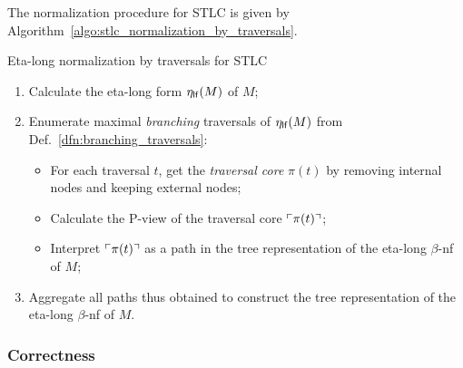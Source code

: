 \documentclass{article}
\theoremstyle{definition}
\def\coresymbol{\pi} %
\newcommand{\core}[1]{\coresymbol(#1)} %
\begin{document}
The normalization procedure for STLC is given by Algorithm~\ref{algo:stlc_normalization_by_traversals}.

\begin{algorithm}[!ht]
\caption{Eta-long normalization by traversals for STLC}
\label{algo:stlc_normalization_by_traversals}
\begin{algorithmic}
\begin{enumerate}
  \item Calculate the eta-long form $\eta_{\sf lf}(M)$ of $M$;
  \item Enumerate maximal \emph{branching} traversals of $\eta_{\sf lf}(M)$ from Def.~\ref{dfn:branching_traversals}:
  \begin{itemize}
  \item For each traversal $t$, get the \emph{traversal core} $\core{t}$ by removing internal nodes and keeping external nodes;
  \item Calculate the P-view of the traversal core $\pview{\core{t}}$;
  \item Interpret $\pview{\core{t}}$ as a path in the tree representation of the eta-long $\beta$-nf of $M$;
  \end{itemize}
  \item Aggregate all paths thus obtained to construct the tree representation of the eta-long $\beta$-nf of $M$.
\end{enumerate}
\end{algorithmic}
\end{algorithm}

\subsubsection*{Correctness}


\end{document}
